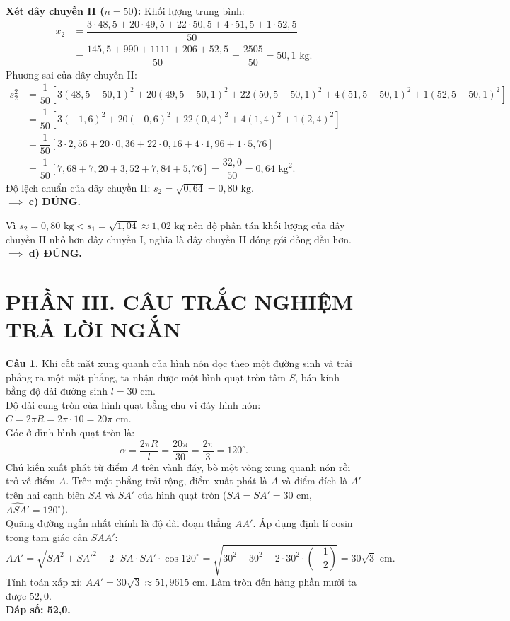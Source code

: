 \documentclass[12pt,a4paper]{article}
\begin{document}
\textbf{Xét dây chuyền II ($n = 50$):}
Khối lượng trung bình:
\begin{align*}
\overline{x}_2 &= \dfrac{3 \cdot 48{,}5 + 20 \cdot 49{,}5 + 22 \cdot 50{,}5 + 4 \cdot 51{,}5 + 1 \cdot 52{,}5}{50} \\
&= \dfrac{145{,}5 + 990 + 1111 + 206 + 52{,}5}{50} = \dfrac{2505}{50} = 50{,}1\text{ kg}.
\end{align*}
Phương sai của dây chuyền II:
\begin{align*}
s_2^2 &= \dfrac{1}{50} \left[ 3(48{,}5 - 50{,}1)^2 + 20(49{,}5 - 50{,}1)^2 + 22(50{,}5 - 50{,}1)^2 + 4(51{,}5 - 50{,}1)^2 + 1(52{,}5 - 50{,}1)^2 \right] \\
&= \dfrac{1}{50} \left[ 3(-1{,}6)^2 + 20(-0{,}6)^2 + 22(0{,}4)^2 + 4(1{,}4)^2 + 1(2{,}4)^2 \right] \\
&= \dfrac{1}{50} \left[ 3 \cdot 2{,}56 + 20 \cdot 0{,}36 + 22 \cdot 0{,}16 + 4 \cdot 1{,}96 + 1 \cdot 5{,}76 \right] \\
&= \dfrac{1}{50} \left[ 7{,}68 + 7{,}20 + 3{,}52 + 7{,}84 + 5{,}76 \right] = \dfrac{32{,}0}{50} = 0{,}64\text{ kg}^2.
\end{align*}
Độ lệch chuẩn của dây chuyền II: $s_2 = \sqrt{0{,}64} = 0{,}80\text{ kg}$.\\
$\implies$ \textbf{c) ĐÚNG.}

Vì $s_2 = 0{,}80\text{ kg} < s_1 = \sqrt{1{,}04} \approx 1{,}02\text{ kg}$ nên độ phân tán khối lượng của dây chuyền II nhỏ hơn dây chuyền I, nghĩa là dây chuyền II đóng gói đồng đều hơn.\\
$\implies$ \textbf{d) ĐÚNG.}

\vspace{0.4cm}
\section*{\large PHẦN III. CÂU TRẮC NGHIỆM TRẢ LỜI NGẮN}

\noindent\textbf{Câu 1.} Khi cắt mặt xung quanh của hình nón dọc theo một đường sinh và trải phẳng ra một mặt phẳng, ta nhận được một hình quạt tròn tâm $S$, bán kính bằng độ dài đường sinh $l = 30\text{ cm}$.\\
Độ dài cung tròn của hình quạt bằng chu vi đáy hình nón: $C = 2\pi R = 2\pi \cdot 10 = 20\pi\text{ cm}$.\\
Góc ở đỉnh hình quạt tròn là:
\[
\alpha = \dfrac{2\pi R}{l} = \dfrac{20\pi}{30} = \dfrac{2\pi}{3} = 120^\circ.
\]
Chú kiến xuất phát từ điểm $A$ trên vành đáy, bò một vòng xung quanh nón rồi trở về điểm $A$. Trên mặt phẳng trải rộng, điểm xuất phát là $A$ và điểm đích là $A'$ trên hai cạnh biên $SA$ và $SA'$ của hình quạt tròn ($SA = SA' = 30\text{ cm}$, $\widehat{ASA'} = 120^\circ$).\\
Quãng đường ngắn nhất chính là độ dài đoạn thẳng $AA'$. Áp dụng định lí cosin trong tam giác cân $SAA'$:
\[
AA' = \sqrt{SA^2 + SA'^2 - 2 \cdot SA \cdot SA' \cdot \cos 120^\circ} = \sqrt{30^2 + 30^2 - 2 \cdot 30^2 \cdot \left(-\dfrac{1}{2}\right)} = 30\sqrt{3}\text{ cm}.
\]
Tính toán xấp xỉ: $AA' = 30\sqrt{3} \approx 51{,}9615\text{ cm}$. Làm tròn đến hàng phần mười ta được $52{,}0$.\\
\textbf{Đáp số: 52,0.}
\end{document}
